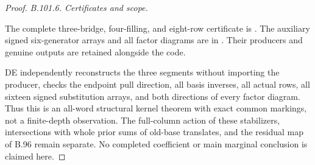 \begin{proof}
\emph{B.101.6. Certificates and scope.}
{\raggedright
The complete three-bridge, four-filling, and eight-row certificate is
.
The auxiliary signed six-generator arrays and all factor diagrams are in
.
Their producers and genuine outputs are retained alongside the code.\par}
DE independently reconstructs the three segments without importing
the producer, checks the endpoint pull direction, all basis inverses,
all actual rows, all sixteen signed substitution arrays, and both
directions of every factor diagram.
Thus this is an all-word structural kernel theorem with exact
common markings, not a finite-depth observation.
The full-column action of these stabilizers, intersections with
whole prior sums of old-base translates, and the residual map of
B.96 remain separate.  No completed coefficient or main marginal
conclusion is claimed here.
\end{proof}

